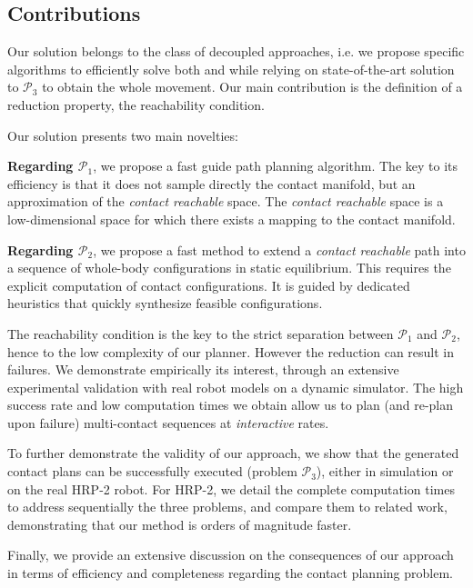\documentclass[journal]{IEEEtran}
\newcommand{\gls}[1]{\textit{#1}}
\begin{document}
\subsection{Contributions}

Our solution belongs to the class of decoupled approaches, 
i.e. 
we
propose
specific
algorithms
to
efficiently
solve
both
\Pa
and \Pb
while 
relying 
on 
state-of-the-art 
solution 
to 
$\mathcal{P}_3$
to 
obtain
the
whole
movement.
Our
main
contribution
is
the
definition        
of
a reduction property, the reachability condition.

Our solution presents two main novelties: 

\noindent \textbf{Regarding $\mathcal{P}_1$}, we propose a fast guide path planning algorithm. The key to its efficiency is that it does not sample directly the contact manifold, but an approximation of the \textit{contact reachable} space. The \textit{contact reachable} space is a low-dimensional space for which there exists a mapping to the contact manifold.

\noindent \textbf{Regarding $\mathcal{P}_2$},  we propose a fast method to extend a \textit{contact reachable} path into a sequence of whole-body configurations in static equilibrium. This  requires the explicit computation of contact configurations. It is guided by dedicated heuristics that quickly synthesize feasible configurations.

The reachability condition is the key to the strict separation between $\mathcal{P}_1$ and $\mathcal{P}_2$, hence to the low complexity of our planner. However the reduction
can result in failures. We demonstrate empirically its interest, through an extensive experimental validation with real robot models on a dynamic simulator. The high success rate and low computation times we obtain allow us to plan (and re-plan upon failure) multi-contact sequences at \gls{interactive} rates.

To further demonstrate the validity of our approach, we show that the generated contact plans  can be successfully executed (problem  $\mathcal{P}_3$), either in simulation or on the real HRP-2 robot. For HRP-2, we detail the complete computation times to address sequentially the three problems, and compare them to related work, demonstrating that our method is orders of magnitude faster.

Finally, we provide an extensive discussion on the consequences of our approach in terms of efficiency and completeness regarding the contact planning problem. \\
\end{document}
